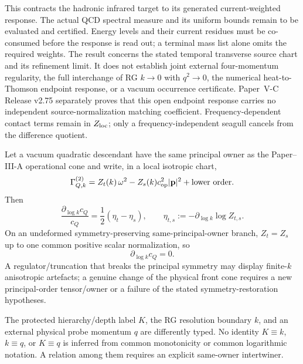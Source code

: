 \documentclass[12pt,a4paper]{article}
\begin{document}
This contracts the hadronic infrared target to its generated current-weighted
response.  The actual QCD spectral measure and its uniform bounds remain to
be evaluated and certified.  Energy levels and their current residues must
be co-consumed before the response is read out; a terminal mass list alone
omits the required weights.  The result concerns the stated temporal
transverse source chart and its refinement limit.  It does not establish
joint external four-momentum regularity, the full interchange of RG $k\to0$
with $q^2\to0$, the numerical heat-to-Thomson endpoint response, or a vacuum
occurrence certificate.  Paper~V-C Release v2.75 separately proves that this
open endpoint response carries no independent source-normalization matching
coefficient.  Frequency-dependent contact terms remain in $Z_{\rm loc}$;
only a frequency-independent seagull cancels from the difference quotient.

\begin{theorem}
\label{p12:thm:v2141-projective-cone-rg-invariance}
Let a vacuum quadratic descendant have the same principal owner as the
Paper--III-A operational cone and write, in a local isotropic chart,
\[
 \Gamma_{Q,k}^{(2)}
 =Z_t(k)\,\omega^2-Z_s(k)c_{\rm op}^2|\mathbf p|^2+\text{lower order}.
\]
Then
\begin{equation}
\label{p12:eq:v2141-beta-c}
 \boxed{
 \frac{\partial_{\log k}c_Q}{c_Q}
 =\frac12\left(\eta_t-\eta_s\right),
 \qquad
 \eta_{t,s}:=-\partial_{\log k}\log Z_{t,s}.}
\end{equation}
On an undeformed symmetry-preserving same-principal-owner branch,
$Z_t=Z_s$ up to one common positive scalar normalization, so
\begin{equation}
\label{p12:eq:v2141-beta-c-zero}
 \boxed{\partial_{\log k}c_Q=0.}
\end{equation}
A regulator/truncation that breaks the principal symmetry may display
finite-$k$ anisotropic artefacts; a genuine change of the physical front cone
requires a new principal-order tensor/owner or a failure of the stated
symmetry-restoration hypotheses.
\end{theorem}

\begin{remark}
\label{p12:rem:v2141-kKq-firewall}
The protected hierarchy/depth label $K$, the RG resolution boundary $k$, and
an external physical probe momentum $q$ are differently typed.  No identity
$K\equiv k$, $k\equiv q$, or $K\equiv q$ is inferred from common monotonicity
or common logarithmic notation.  A relation among them requires an explicit
same-owner intertwiner.
\end{remark}
\end{document}

